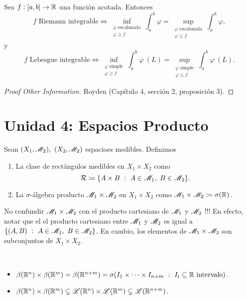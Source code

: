 \begin{prop}
	Sea $f : [a,b] \to \mathbb{R}$ una función acotada. Entonces
	\[ f \text{ Riemann integrable} \iff \inf_{\substack{\varphi \text{ escalonada} \\ \varphi \geq f}} \int_{a}^{b} \varphi = \sup_{\substack{\varphi \text{ escalonada} \\ \varphi \leq f}} \int_{a}^{b} \varphi, \]
	y
	\[ f \text{ Lebesgue integrable} \iff \inf_{\substack{\varphi \text{ simple} \\ \varphi \geq f}} \int_{a}^{b} \varphi \ (L) = \sup_{\substack{\varphi \text{ simple} \\ \varphi \leq f}} \int_{a}^{b} \varphi \ (L). \]
\end{prop}
\begin{proof}[Proof Other Information]
	Royden (Capítulo 4, sección 2, proposición 3).
\end{proof}

\chapter{Unidad 4: Espacios Producto}

\begin{definition}
	Sean $(X_{1}, \mathscr{M}_{2}), \ (X_{2}, \mathscr{M}_{2})$ espacioes medibles. Definimos
	\begin{enumerate}
		\item La clase de rectángulos medibles en $X_{1} \times X_{2}$ como
		\[ \mathcal{R} \coloneq \{A \times B \ : \ A \in \mathscr{M}_{1},\ B \in \mathscr{M}_{2}\}. \]

		\item La $\sigma$-álgebra producto $\mathscr{M}_{1} \times \mathscr{M}_{2}$ en $X_{1} \times X_{2}$ como $\mathscr{M}_{1} \times \mathscr{M}_{2} \coloneq \sigma(\mathbb{R})$.
	\end{enumerate}
\end{definition}

\begin{note}
	No confundir $\mathscr{M}_{1} \times \mathscr{M}_{2}$ con el producto cartesiano de $\mathscr{M}_{1}$ y $\mathscr{M}_{2}$ !!! En efecto, notar que el el producto cartesiano entre $\mathscr{M}_{1}$ y $\mathscr{M}_{2}$ es igual a $\{(A, B) \ : \ A \in \mathscr{M}_{1},\ B \in \mathscr{M}_{2}\}$. En cambio, los elementos de $\mathscr{M}_{1} \times \mathscr{M}_{2}$ son subconjuntos de $X_{1} \times X_{2}$. 
\end{note}

\begin{eg}~
	\begin{itemize}
		\item $\beta(\mathbb{R}^n) \times \beta(\mathbb{R}^m) = \beta(\mathbb{R}^{n+m}) = \sigma(I_{1} \times \cdots \times I_{n+m} \ : \ I_{i} \subseteq \mathbb{R} \text{ intervalo})$.

		\item $\beta(\mathbb{R}^n) \times \beta(\mathbb{R}^m) \subsetneq \mathscr{L}(\mathbb{R}^n) \times \mathscr{L}(\mathbb{R}^m) \subsetneq \mathscr{L}(\mathbb{R}^{n+m})$.
	\end{itemize}
\end{eg}

